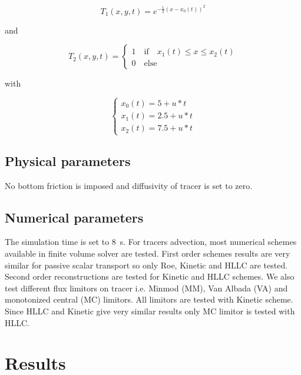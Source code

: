 \begin{equation*}
T_1(x,y,t)=e^{-\frac{1}{2}{(x-x_0(t))^2}}
\end{equation*}

and 

\begin{equation*}
T_2(x,y,t)=
\left\{
    \begin{array}{ll}
        1 \quad \text{if} \quad x_1(t) \leq x \leq x_2(t) \\
        0 \quad \text{else}
    \end{array}
\right.
\end{equation*}

with 

\begin{equation*}
\left\{
    \begin{array}{ll}
        x_0(t) = 5 + u*t \\
        x_1(t) = 2.5 + u*t \\
        x_2(t) = 7.5 + u*t
    \end{array}
\right.
\end{equation*}


\subsection{Physical parameters}

No bottom friction is imposed and diffusivity of tracer is set to zero.

\subsection{Numerical parameters}

The simulation time is set to 8~s.
For tracers advection, most numerical schemes available in  finite volume solver are tested.
First order schemes results are very similar for passive scalar transport so only Roe, Kinetic and HLLC 
are tested. Second order reconstructions are tested for Kinetic and HLLC schemes. We also test different
flux limitors on tracer i.e. Minmod (MM), Van Albada (VA) and monotonized central (MC) limitors.
All limitors are tested with Kinetic scheme. Since HLLC and Kinetic give very similar results only MC limitor
is tested with HLLC.

\section{Results}

